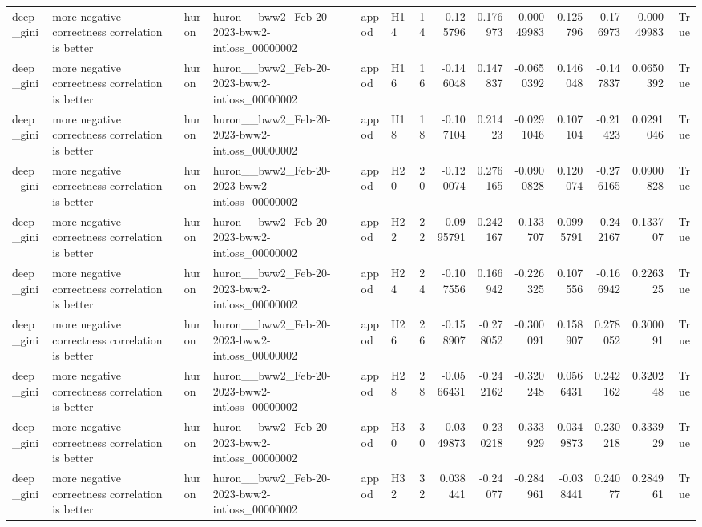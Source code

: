 \begin{longtable}{llllllrrrrrrrr}
deep\_gini & more negative correctness correlation is better & huron & huron\_\_bww2\_Feb-20-2023-bww2-intloss\_00000002 & appod & H14 & 14 & -0.125796 & 0.176973 & 0.00049983 & 0.125796 & -0.176973 & -0.00049983 & True \\
deep\_gini & more negative correctness correlation is better & huron & huron\_\_bww2\_Feb-20-2023-bww2-intloss\_00000002 & appod & H16 & 16 & -0.146048 & 0.147837 & -0.0650392 & 0.146048 & -0.147837 & 0.0650392 & True \\
deep\_gini & more negative correctness correlation is better & huron & huron\_\_bww2\_Feb-20-2023-bww2-intloss\_00000002 & appod & H18 & 18 & -0.107104 & 0.21423 & -0.0291046 & 0.107104 & -0.21423 & 0.0291046 & True \\
deep\_gini & more negative correctness correlation is better & huron & huron\_\_bww2\_Feb-20-2023-bww2-intloss\_00000002 & appod & H20 & 20 & -0.120074 & 0.276165 & -0.0900828 & 0.120074 & -0.276165 & 0.0900828 & True \\
deep\_gini & more negative correctness correlation is better & huron & huron\_\_bww2\_Feb-20-2023-bww2-intloss\_00000002 & appod & H22 & 22 & -0.0995791 & 0.242167 & -0.133707 & 0.0995791 & -0.242167 & 0.133707 & True \\
deep\_gini & more negative correctness correlation is better & huron & huron\_\_bww2\_Feb-20-2023-bww2-intloss\_00000002 & appod & H24 & 24 & -0.107556 & 0.166942 & -0.226325 & 0.107556 & -0.166942 & 0.226325 & True \\
deep\_gini & more negative correctness correlation is better & huron & huron\_\_bww2\_Feb-20-2023-bww2-intloss\_00000002 & appod & H26 & 26 & -0.158907 & -0.278052 & -0.300091 & 0.158907 & 0.278052 & 0.300091 & True \\
deep\_gini & more negative correctness correlation is better & huron & huron\_\_bww2\_Feb-20-2023-bww2-intloss\_00000002 & appod & H28 & 28 & -0.0566431 & -0.242162 & -0.320248 & 0.0566431 & 0.242162 & 0.320248 & True \\
deep\_gini & more negative correctness correlation is better & huron & huron\_\_bww2\_Feb-20-2023-bww2-intloss\_00000002 & appod & H30 & 30 & -0.0349873 & -0.230218 & -0.333929 & 0.0349873 & 0.230218 & 0.333929 & True \\
deep\_gini & more negative correctness correlation is better & huron & huron\_\_bww2\_Feb-20-2023-bww2-intloss\_00000002 & appod & H32 & 32 & 0.038441 & -0.24077 & -0.284961 & -0.038441 & 0.24077 & 0.284961 & True \\

\end{longtable}
